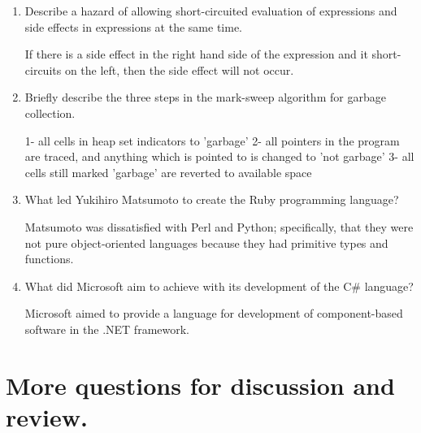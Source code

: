 \begin{enumerate}
\begin{answer}
    \end{answer}

  \item Describe a hazard of allowing short-circuited evaluation
    of expressions and side effects in expressions at the same time.

  \begin{answer}

    If there is a side effect in the right hand side of the expression and
    it short-circuits on the left, then the side effect will not occur.

    \end{answer}

  \item Briefly describe the three steps in the mark-sweep algorithm
    for garbage collection.

  \begin{answer}

    1- all cells in heap set indicators to 'garbage'
    2- all pointers in the program are traced, and anything which is pointed
       to is changed to 'not garbage'
    3- all cells still marked 'garbage' are reverted to available space

    \end{answer}

  \item What led Yukihiro Matsumoto to create the Ruby programming language?

  \begin{answer}

    Matsumoto was dissatisfied with Perl and Python; specifically, that they
    were not pure object-oriented languages because they had primitive types
    and functions.

    \end{answer}

  \item What did Microsoft aim to achieve with its development of the
    C\# language?

  \begin{answer}

    Microsoft aimed to provide a language for development of component-based
    software in the .NET framework.

    \end{answer}

  \end{enumerate}



\section{More questions for discussion and review.}

